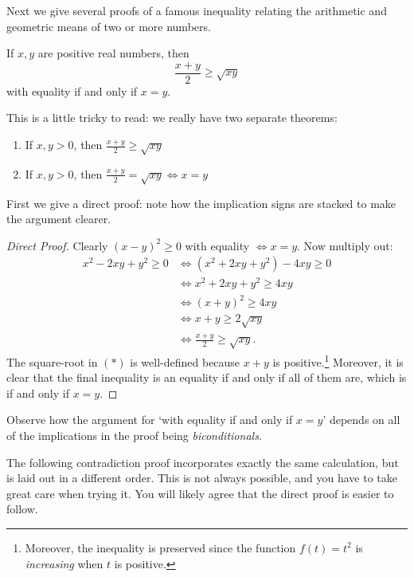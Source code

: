 Next we give several proofs of a famous inequality relating the arithmetic and geometric means of two or more numbers.

\begin{thm}\label{thm:amgm}
If $x,y$ are positive real numbers, then
\[\frac{x+y}{2}\ge\sqrt{xy}\]
with equality if and only if $x=y$.
\end{thm}

\noindent This is a little tricky to read: we really have two separate theorems:
\begin{enumerate}
  \item If $x,y>0$, then $\frac{x+y}{2}\ge\sqrt{xy}$
  \item If $x,y>0$, then $\frac{x+y}{2}=\sqrt{xy}\iff x=y$
\end{enumerate}

\noindent First we give a direct proof: note how the implication signs are stacked to make the argument clearer.

\begin{proof}[Direct Proof]
Clearly $(x-y)^2\ge 0$ with equality $\iff x=y$. Now multiply out:
\begin{align*}
x^2-2xy+y^2\ge 0&\iff (x^2+2xy+y^2)- 4xy  \ge 0 \\
&\iff x^2+2xy+y^2\ge 4xy\\
&\iff (x+y)^2\ge 4xy\\
&\iff x+y\ge 2\sqrt{xy}\tag*{($\ast$)}\\
&\iff \frac{x+y}{2}\ge \sqrt{xy}.
\end{align*}
The square-root in $(\ast)$ is well-defined because $x+y$ is positive.\footnote{Moreover, the inequality is preserved since the function $f(t)=t^2$ is \emph{increasing} when $t$ is positive.} Moreover, it is clear that the final inequality is an equality if and only if all of them are, which is if and only if $x=y$.
\end{proof}

\noindent Observe how the argument for `with equality if and only if $x=y$' depends on all of the implications in the proof being \emph{biconditionals.}\pagebreak

\noindent The following contradiction proof incorporates exactly the same calculation, but is laid out in a different order. This is not always possible, and you have to take great care when trying it. You will likely agree that the direct proof is easier to follow.

